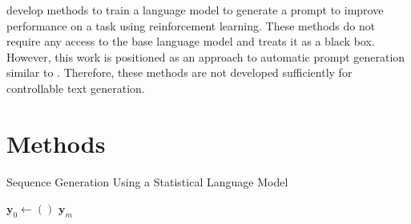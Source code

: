 \documentclass[phd,electronic,oneside,twosidetoc,letterpaper,chaptercenter,parttop,lof]{byumsphd}
\begin{document}
\citet{deng-etal-2022-rlprompt} develop methods to train a language model to generate a prompt to improve performance on a task using reinforcement learning.
These methods do not require any access to the base language model and treats it as a black box.
However, this work is positioned as an approach to automatic prompt generation similar to \citet{shin2020autoprompt}. 
Therefore, these methods are not developed sufficiently for controllable text generation.


\section{Methods}
\label{methods}


\begin{algorithm}[t]
\caption{Sequence Generation Using a Statistical Language Model}
\label{alg:generate}
\SetAlgoLined
\DontPrintSemicolon
{}

$\mathbf{y}_0 \leftarrow ()$ 
\Return $\mathbf{y}_m$\;
\end{algorithm}
\end{document}
